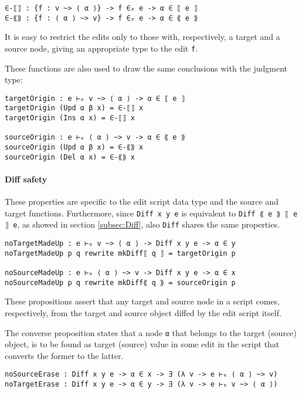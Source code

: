 \documentclass[../Thesis.tex]{subfiles}
\begin{document}
\begin{verbatim}
∈-⟦⟧ : {f : v ~> ⟨ α ⟩} -> f ∈ₑ e -> α ∈ ⟦ e ⟧ 
∈-⟪⟫ : {f : ⟨ α ⟩ ~> v} -> f ∈ₑ e -> α ∈ ⟪ e ⟫
\end{verbatim}

	It is easy to restrict the edits only to those with, respectively, a target and
	a source node, giving an appropriate type to the edit \texttt{f}.

	These functions are also used to draw the same conclusions with the 
	judgment type:
\begin{verbatim}
targetOrigin : e ⊢ₑ v ~> ⟨ α ⟩ -> α ∈ ⟦ e ⟧
targetOrigin (Upd α β x) = ∈-⟦⟧ x
targetOrigin (Ins α x) = ∈-⟦⟧ x

sourceOrigin : e ⊢ₑ ⟨ α ⟩ ~> v -> α ∈ ⟪ e ⟫
sourceOrigin (Upd α β x) = ∈-⟪⟫ x
sourceOrigin (Del α x) = ∈-⟪⟫ x
\end{verbatim}

	\paragraph{Diff safety}
	These properties are specific to the edit script data type and the source and 
	target functions.
	Furthermore, since \texttt{Diff x y e} is equivalent
	to \texttt{Diff ⟪ e ⟫ ⟦ e ⟧ e}, as showed in section \ref{subsec:Diff},
	also \texttt{Diff} shares the same properties.
	
\begin{verbatim}
noTargetMadeUp : e ⊢ₑ v ~> ⟨ α ⟩ -> Diff x y e -> α ∈ y 
noTargetMadeUp p q rewrite mkDiff⟦ q ⟧ = targetOrigin p

noSourceMadeUp : e ⊢ₑ ⟨ α ⟩ ~> v -> Diff x y e -> α ∈ x 
noSourceMadeUp p q rewrite mkDiff⟪ q ⟫ = sourceOrigin p
\end{verbatim}

	These propositions assert that any target and
	source node in a script comes, respectively, from the target and
	source object diffed by the edit script itself.
	
	The converse proposition states that a node \texttt{α} that belongs
	to the target (source) object, is to be found as target (source) value 
	in some edit in the script that converts the former to the latter.

\begin{verbatim}
noSourceErase : Diff x y e -> α ∈ x -> ∃ (λ v -> e ⊢ₑ ⟨ α ⟩ ~> v)
noTargetErase : Diff x y e -> α ∈ y -> ∃ (λ v -> e ⊢ₑ v ~> ⟨ α ⟩) 
\end{verbatim}
\end{document}

